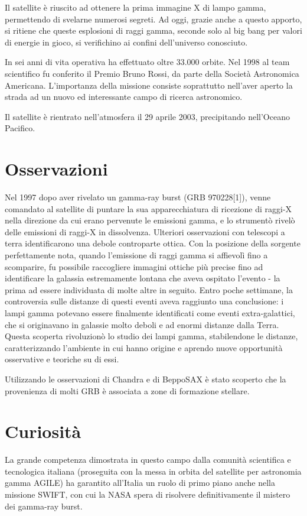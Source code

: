\documentclass[12pt,a4paper]{article}
\begin{document}
Il satellite è riuscito ad ottenere la prima immagine X di lampo gamma, permettendo di svelarne numerosi segreti. Ad oggi, grazie anche a questo apporto, si ritiene che queste esplosioni di raggi gamma, seconde solo al big bang per valori di energie in gioco, si verifichino ai confini dell'universo conosciuto.

In sei anni di vita operativa ha effettuato oltre 33.000 orbite. Nel 1998 al team scientifico fu conferito il Premio Bruno Rossi, da parte della Società Astronomica Americana. L'importanza della missione consiste soprattutto nell'aver aperto la strada ad un nuovo ed interessante campo di ricerca astronomico.

Il satellite è rientrato nell'atmosfera il 29 aprile 2003, precipitando nell'Oceano Pacifico.

\section*{Osservazioni}
\label{osservazioni}

Nel 1997 dopo aver rivelato un gamma-ray burst (GRB 970228[1]), venne comandato al satellite di puntare la sua apparecchiatura di ricezione di raggi-X nella direzione da cui erano pervenute le emissioni gamma, e lo strumentò rivelò delle emissioni di raggi-X in dissolvenza. Ulteriori osservazioni con telescopi a terra identificarono una debole controparte ottica. Con la posizione della sorgente perfettamente nota, quando l'emissione di raggi gamma si affievolì fino a scomparire, fu possibile raccogliere immagini ottiche più precise fino ad identificare la galassia estremamente lontana che aveva ospitato l'evento - la prima ad essere individuata di molte altre in seguito. Entro poche settimane, la controversia sulle distanze di questi eventi aveva raggiunto una conclusione: i lampi gamma potevano essere finalmente identificati come eventi extra-galattici, che si originavano in galassie molto deboli e ad enormi distanze dalla Terra. Questa scoperta rivoluzionò lo studio dei lampi gamma, stabilendone le distanze, caratterizzando l'ambiente in cui hanno origine e aprendo nuove opportunità osservative e teoriche su di essi.

Utilizzando le osservazioni di Chandra e di BeppoSAX è stato scoperto che la provenienza di molti GRB è associata a zone di formazione stellare.

\section*{Curiosità}
\label{curiosit}

La grande competenza dimostrata in questo campo dalla comunità scientifica e tecnologica italiana (proseguita con la messa in orbita del satellite per astronomia gamma AGILE) ha garantito all'Italia un ruolo di primo piano anche nella missione SWIFT, con cui la NASA spera di risolvere definitivamente il mistero dei gamma-ray burst.
\end{document}
